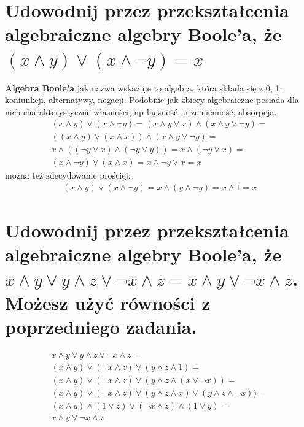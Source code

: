 \documentclass{article}
\begin{document}
\section{Udowodnij przez przekształcenia algebraiczne algebry Boole’a, że $(x \wedge y) \vee (x \wedge \neg y) = x$}
\textbf{Algebra Boole'a} jak nazwa wskazuje to algebra, która składa się z 0, 1, koniunkcji, alternatywy, negacji. Podobnie jak zbiory algebraiczne posiada dla nich charakterystyczne własności, np łączność, przemienność, absorpcja.\\
\begin{gather*}
(x \wedge y) \vee (x \wedge \neg y) =  (x \wedge y \vee x) \wedge (x \wedge y \vee \neg y) = \\ ((x \wedge y) \vee (x \wedge x)) \wedge (x \wedge y \vee \neg y) = \\ x \wedge ((\neg y \vee x) \wedge (\neg y \vee y)) = x \wedge (\neg y \vee x) = \\ (x \wedge \neg y) \vee (x \wedge x) = x \wedge \neg y \vee x = x
\end{gather*}
można też zdecydowanie prościej:
\begin{gather*}
(x \wedge y) \vee (x \wedge \neg y) = x \wedge (y \wedge \neg y) = x \wedge 1 = x
\end{gather*}
\section{Udowodnij przez przekształcenia algebraiczne algebry Boole'a, że $x \wedge y \vee y \wedge z \vee \neg x \wedge z = x \wedge y \vee \neg x \wedge z$. Możesz użyć równości z poprzedniego zadania.}
\begin{gather*}
x \wedge y \vee y \wedge z \vee \neg x \wedge z = \\ 
(x \wedge y) \vee (\neg x \wedge z) \vee (y \wedge z \wedge 1) = \\ 
(x \wedge y) \vee (\neg x \wedge z) \vee (y \wedge z \wedge (x \vee \neg x)) = \\ 
(x \wedge y) \vee (\neg x \wedge z) \vee (y \wedge z \wedge x) \vee (y \wedge z \wedge \neg x)) = \\ 
(x \wedge y) \wedge (1 \vee z) \vee (\neg x \wedge z) \wedge(1 \vee y) = \\
x \wedge y \vee \neg x \wedge z\\
\end{gather*}
\end{document}
